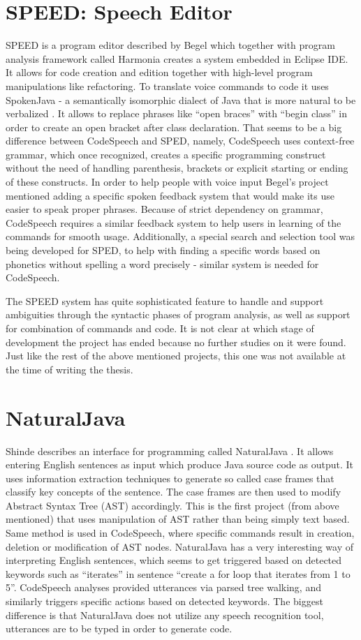 \section{SPEED: Speech Editor}
SPEED is a program editor described by Begel \cite{Begel2005} which together with program analysis framework called Harmonia \cite{Boshernitsan2001} creates a system embedded in Eclipse IDE. It allows for code creation and edition together with high-level program manipulations like refactoring. To translate voice commands to code it uses SpokenJava - a semantically isomorphic dialect of Java that is more natural to be verbalized \cite{Begel2004}. It allows to replace phrases like ``open braces'' with ``begin class'' in order to create an open bracket after class declaration. That seems to be a big difference between CodeSpeech and SPED, namely, CodeSpeech uses context-free grammar, which once recognized, creates a specific programming construct without the need of handling parenthesis, brackets or explicit starting or ending of these constructs. In order to help people with voice input Begel's project mentioned adding a specific spoken feedback system that would make its use easier to speak proper phrases. Because of strict dependency on grammar, CodeSpeech requires a similar feedback system to help users in learning of the commands for smooth usage. Additionally, a special search and selection tool was being developed for SPED, to help with finding a specific words based on phonetics without spelling a word precisely - similar system is needed for CodeSpeech.

The SPEED system has quite sophisticated feature to handle and support ambiguities through the syntactic phases of program analysis, as well as support for combination of commands and code. It is not clear at which stage of development the project has ended because no further studies on it were found. Just like the rest of the above mentioned projects, this one was not available at the time of writing the thesis. 

\section{NaturalJava}
Shinde describes an interface for programming called NaturalJava \cite{Shinde2017}. It allows entering English sentences as input which produce Java source code as output. It uses information extraction techniques to generate so called case frames that classify key concepts of the sentence. The case frames are then used to modify Abstract Syntax Tree (AST) accordingly. This is the first project (from above mentioned) that uses manipulation of AST rather than being simply text based. Same method is used in CodeSpeech, where specific commands result in creation, deletion or modification of AST nodes. NaturalJava has a very interesting way of interpreting English sentences, which seems to get triggered based on detected keywords such as ``iterates'' in sentence ``create a for loop that iterates from 1 to 5''. CodeSpeech analyses provided utterances via parsed tree walking, and similarly triggers specific actions based on detected keywords. The biggest difference is that NaturalJava does not utilize any speech recognition tool, utterances are to be typed in order to generate code.

